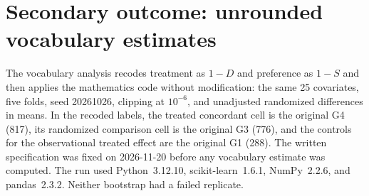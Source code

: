 \documentclass[twoside,11pt]{article}
\begin{document}
\section{Secondary outcome: unrounded vocabulary estimates}
\label{sec:vocab-exact}

The vocabulary analysis recodes treatment as $1-D$ and preference as $1-S$ and then applies the mathematics code without modification: the same 25 covariates, five folds, seed 20261026, clipping at $10^{-6}$, and unadjusted randomized differences in means. In the recoded labels, the treated concordant cell is the original G4 (817), its randomized comparison cell is the original G3 (776), and the controls for the observational treated effect are the original G1 (288). The written specification was fixed on 2026-11-20 before any vocabulary estimate was computed. The run used Python~3.12.10, scikit-learn~1.6.1, NumPy~2.2.6, and pandas~2.3.2. Neither bootstrap had a failed replicate.
\end{document}
